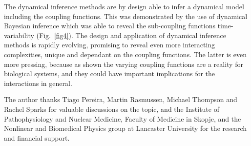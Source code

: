\documentclass[pre,aps,twocolumn,showpacs]{revtex4}
\begin{document}
The dynamical inference methods are by design able to infer a dynamical model including the coupling functions. This was demonstrated by the use of dynamical Bayesian inference which was able to reveal the sub-coupling functions time-variability (Fig.\ \ref{fig4}). The design and application of dynamical inference methods is rapidly evolving, promising to reveal even more interacting complexities, unique and dependant on the coupling functions. The latter is even more pressing, because as shown the varying coupling functions are a reality for biological systems, and they could have important implications for the interactions in general.

\acknowledgments
The author thanks Tiago Pereira, Martin Rasmussen, Michael Thompson and Rachel Sparks for valuable discussions on the topic, and the Institute of Pathophysiology and Nuclear Medicine, Faculty of Medicine in Skopje, and the Nonlinear and Biomedical Physics group at Lancaster University for the research and financial support.

%
\end{document}
